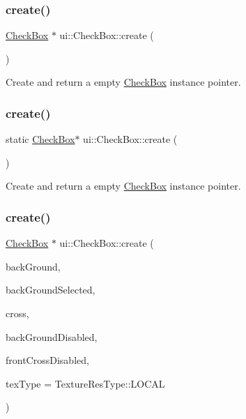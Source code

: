 \subsubsection{\texorpdfstring{create()}{create()}\hspace{0.1cm}{\footnotesize\ttfamily [1/6]}}
{\footnotesize\ttfamily \hyperlink{classui_1_1CheckBox}{Check\+Box} $\ast$ ui\+::\+Check\+Box\+::create (\begin{DoxyParamCaption}\item[{void}]{ }\end{DoxyParamCaption})\hspace{0.3cm}{\ttfamily [static]}}

Create and return a empty \hyperlink{classui_1_1CheckBox}{Check\+Box} instance pointer. \mbox{\label{classui_1_1CheckBox_aab5aa345790ab101bdba6c6cdc716f0d}} 
\subsubsection{\texorpdfstring{create()}{create()}\hspace{0.1cm}{\footnotesize\ttfamily [2/6]}}
{\footnotesize\ttfamily static \hyperlink{classui_1_1CheckBox}{Check\+Box}$\ast$ ui\+::\+Check\+Box\+::create (\begin{DoxyParamCaption}{ }\end{DoxyParamCaption})\hspace{0.3cm}{\ttfamily [static]}}

Create and return a empty \hyperlink{classui_1_1CheckBox}{Check\+Box} instance pointer. \mbox{\label{classui_1_1CheckBox_afa2664bd59e2dc90b39ef4085bdaeade}} 
\subsubsection{\texorpdfstring{create()}{create()}\hspace{0.1cm}{\footnotesize\ttfamily [3/6]}}
{\footnotesize\ttfamily \hyperlink{classui_1_1CheckBox}{Check\+Box} $\ast$ ui\+::\+Check\+Box\+::create (\begin{DoxyParamCaption}\item[{const std\+::string \&}]{back\+Ground,  }\item[{const std\+::string \&}]{back\+Ground\+Selected,  }\item[{const std\+::string \&}]{cross,  }\item[{const std\+::string \&}]{back\+Ground\+Disabled,  }\item[{const std\+::string \&}]{front\+Cross\+Disabled,  }\item[{\hyperlink{classui_1_1Widget_a040a65ec5ad3b11119b7e16b98bd9af0}{Texture\+Res\+Type}}]{tex\+Type = {\ttfamily TextureResType\+:\+:LOCAL} }\end{DoxyParamCaption})\hspace{0.3cm}{\ttfamily [static]}}

